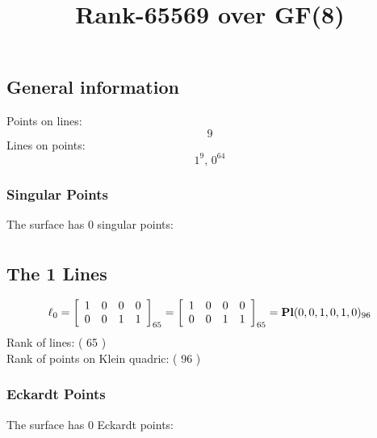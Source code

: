 \documentclass{article}
\newcommand\setTBstruts{\def\T{\rule{0pt}{2.6ex}}%
\def\B{\rule[-1.2ex]{0pt}{0pt}}}
\begin{document}
 
\setTBstruts



{\allowdisplaybreaks%






\title{Rank-65569 over GF(8)}
\author{}%
\maketitle%
%
{}



\subsection*{General information}
Points on lines:
$$
9$$
Lines on points:
$$
1^9,\,0^{64}$$
\subsubsection*{Singular Points}
The surface has 0 singular points:\\
\begin{align*}
\end{align*}
\subsection*{The 1 Lines}
$$
\ell_{0} = 
\left[
\begin{array}{*{4}{r}}
1 & 0 & 0 & 0\\
0 & 0 & 1 & 1\\
\end{array}
\right]
_{65}
=
\left[
\begin{array}{*{4}c}
1  & 0  & 0  & 0\\
0  & 0  & 1  & 1\\
\end{array}
\right]_{65}
={\rm\bf Pl}(0,0,1,0,1,0 )_{96}$$
Rank of lines: ( 65 )\\
Rank of points on Klein quadric: ( 96 )\\
\subsubsection*{Eckardt Points}
The surface has 0 Eckardt points:\\
}
\end{document}
